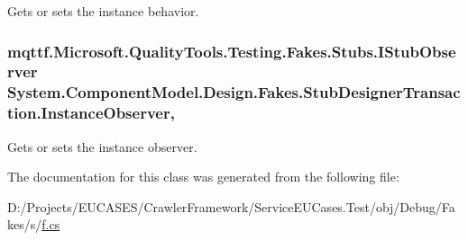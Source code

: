 Gets or sets the instance behavior.

\hypertarget{class_system_1_1_component_model_1_1_design_1_1_fakes_1_1_stub_designer_transaction_a7621b3c8d10cde8b59d09eb7f789ed7c}{
\subsubsection[{Instance\-Observer}]{\setlength{\rightskip}{0pt plus 5cm}mqttf.\-Microsoft.\-Quality\-Tools.\-Testing.\-Fakes.\-Stubs.\-I\-Stub\-Observer System.\-Component\-Model.\-Design.\-Fakes.\-Stub\-Designer\-Transaction.\-Instance\-Observer\hspace{0.3cm}{\ttfamily [get]}, {\ttfamily [set]}}}\label{class_system_1_1_component_model_1_1_design_1_1_fakes_1_1_stub_designer_transaction_a7621b3c8d10cde8b59d09eb7f789ed7c}


Gets or sets the instance observer.



The documentation for this class was generated from the following file\-:\begin{DoxyCompactItemize}
\item 
D\-:/\-Projects/\-E\-U\-C\-A\-S\-E\-S/\-Crawler\-Framework/\-Service\-E\-U\-Cases.\-Test/obj/\-Debug/\-Fakes/s/\hyperlink{s_2f_8cs}{f.\-cs}\end{DoxyCompactItemize}
